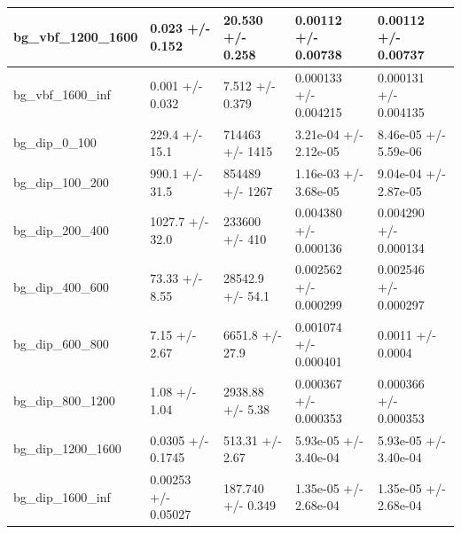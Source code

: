 \documentclass[a4paper, 10pt]{article}
\begin{document}
\begin{table}[H]
\begin{center}
\begin{tabular}{|m{20.0mm}|m{27.0mm}|m{27.0mm}|m{33.0mm}|m{32.0mm}|}
      \hline
      {\cellcolor{white}         bg\_vbf\_1200\_1600}& {\cellcolor{white}         0.023 +/\-- 0.152}& {\cellcolor{white}         20.530 +/\-- 0.258}& {\cellcolor{white}         0.00112 +/\-- 0.00738}& {\cellcolor{white}         0.00112 +/\-- 0.00737}\\
      \hline
      {\cellcolor{white}         bg\_vbf\_1600\_inf}& {\cellcolor{white}         0.001 +/\-- 0.032}& {\cellcolor{white}         7.512 +/\-- 0.379}& {\cellcolor{white}         0.000133 +/\-- 0.004215}& {\cellcolor{white}         0.000131 +/\-- 0.004135}\\
      \hline
      {\cellcolor{white}         bg\_dip\_0\_100}& {\cellcolor{white}         229.4 +/\-- 15.1}& {\cellcolor{white}         714463 +/\-- 1415}& {\cellcolor{white}         3.21e-04 +/\-- 2.12e-05}& {\cellcolor{white}         8.46e-05 +/\-- 5.59e-06}\\
      \hline
      {\cellcolor{white}         bg\_dip\_100\_200}& {\cellcolor{white}         990.1 +/\-- 31.5}& {\cellcolor{white}         854489 +/\-- 1267}& {\cellcolor{white}         1.16e-03 +/\-- 3.68e-05}& {\cellcolor{white}         9.04e-04 +/\-- 2.87e-05}\\
      \hline
      {\cellcolor{white}         bg\_dip\_200\_400}& {\cellcolor{white}         1027.7 +/\-- 32.0}& {\cellcolor{white}         233600 +/\-- 410}& {\cellcolor{white}         0.004380 +/\-- 0.000136}& {\cellcolor{white}         0.004290 +/\-- 0.000134}\\
      \hline
      {\cellcolor{white}         bg\_dip\_400\_600}& {\cellcolor{white}         73.33 +/\-- 8.55}& {\cellcolor{white}         28542.9 +/\-- 54.1}& {\cellcolor{white}         0.002562 +/\-- 0.000299}& {\cellcolor{white}         0.002546 +/\-- 0.000297}\\
      \hline
      {\cellcolor{white}         bg\_dip\_600\_800}& {\cellcolor{white}         7.15 +/\-- 2.67}& {\cellcolor{white}         6651.8 +/\-- 27.9}& {\cellcolor{white}         0.001074 +/\-- 0.000401}& {\cellcolor{white}         0.0011 +/\-- 0.0004}\\
      \hline
      {\cellcolor{white}         bg\_dip\_800\_1200}& {\cellcolor{white}         1.08 +/\-- 1.04}& {\cellcolor{white}         2938.88 +/\-- 5.38}& {\cellcolor{white}         0.000367 +/\-- 0.000353}& {\cellcolor{white}         0.000366 +/\-- 0.000353}\\
      \hline
      {\cellcolor{white}         bg\_dip\_1200\_1600}& {\cellcolor{white}         0.0305 +/\-- 0.1745}& {\cellcolor{white}         513.31 +/\-- 2.67}& {\cellcolor{white}         5.93e-05 +/\-- 3.40e-04}& {\cellcolor{white}         5.93e-05 +/\-- 3.40e-04}\\
      \hline
      {\cellcolor{white}         bg\_dip\_1600\_inf}& {\cellcolor{white}         0.00253 +/\-- 0.05027}& {\cellcolor{white}         187.740 +/\-- 0.349}& {\cellcolor{white}         1.35e-05 +/\-- 2.68e-04}& {\cellcolor{white}         1.35e-05 +/\-- 2.68e-04}\\
\hline
    \end{tabular}
  \end{center}
\end{table}
\end{document}
